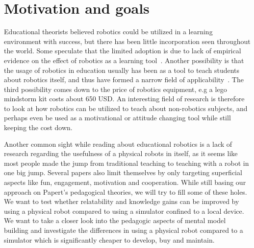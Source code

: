 

\section{Motivation and goals}
Educational theorists believed robotics could be utilized in a learning environment with success, but there has been little
incorporation seen throughout the world. 
Some speculate that the limited adoption is due to lack of empirical evidence on the effect of robotics as a learning tool~\cite{williams2007acquisition}.  
Another possibility is that the usage of robotics in education usually has been as a tool to teach students about robotics itself, 
and thus have formed a narrow field of applicability~\cite{rusk2008new}. 
The third possibility comes down to the price of robotics equipment, e.g a lego mindstorm kit costs about 650 USD. 
An interesting field of research is therefore to look at how robotics can be utilized to teach about non-robotics subjects, and perhaps even be used as a motivational or attitude changing tool while still keeping the cost down.

\bigskip\noindent
Another common sight while reading about educational robotics is a lack of research regarding the usefulness of a physical robots in itself, as it seems like most people made the jump from traditional teaching to teaching with a robot in one big jump. 
Several papers also limit themselves by only targeting superficial aspects like fun, engagement, motivation and cooperation. 
While still basing our approach on Papert's pedagogical theories, we will try to fill some of these holes. We want to test whether relatability and knowledge gains can be improved by using a physical robot compared to using a simulator confined to a local device. 
We want to take a closer look into the pedagogic aspects of mental model building and investigate the differences in using a physical robot compared to a simulator which is significantly cheaper to develop, buy and maintain.

